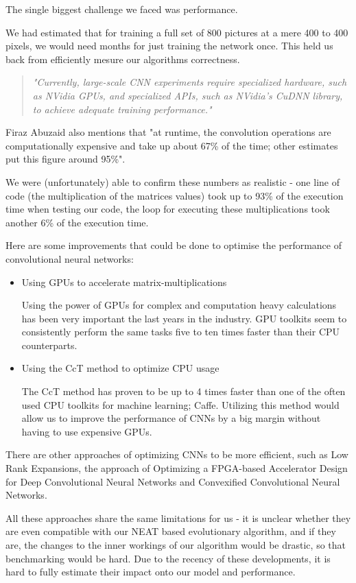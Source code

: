 The single biggest challenge we faced was performance.

We had estimated that for training a full set of 800 pictures at a mere 400 to 400 pixels, we would need months for just training the network once. This held us back from efficiently mesure our algorithms correctness.

\begin{quote}
	\emph{"Currently, large-scale CNN experiments require specialized hardware, such as NVidia GPUs,
		and specialized APIs, such as NVidia’s CuDNN library, to
		achieve  adequate  training  performance."} \cite{Abuzaid2015} 
\end{quote}

Firaz Abuzaid also mentions that "at runtime,  the convolution operations are computationally expensive and take up about 67\% of the time; other estimates put this figure around 95\%".

We were (unfortunately) able to confirm these numbers as realistic - one line of code (the multiplication of the matrices values) took up to 93\% of the execution time when testing our code, the loop for executing these multiplications took another 6\% of the execution time. 

Here are some improvements that could be done to optimise the performance of convolutional neural networks:

\begin{itemize}
	\item Using GPUs to accelerate matrix-multiplications\cite{Hochberg2012}
	
	Using the power of GPUs for complex and computation heavy calculations has been very important the last years in the industry. GPU toolkits seem to consistently perform the same tasks five to ten times faster than their CPU counterparts.\cite{Abuzaid2015}
	
	\item Using the CcT method to optimize CPU usage
	
	The CcT method has proven to be up to 4 times faster than one of the often used CPU toolkits for machine learning; Caffe. Utilizing this method would allow us to improve the performance of CNNs by a big margin without having to use expensive GPUs.\cite{Abuzaid2015}
\end{itemize}

There are other approaches of optimizing CNNs to be more efficient, such as Low Rank Expansions\cite{Jaderberg2014},  the approach of Optimizing a FPGA-based Accelerator Design for Deep Convolutional Neural Networks\cite{Zhang2015} and Convexified Convolutional Neural Networks\cite{Zhang2016}.

All these approaches share the same limitations for us - it is unclear whether they are even compatible with our NEAT based evolutionary algorithm, and if they are, the changes to the inner workings of our algorithm would be drastic, so that benchmarking would be hard. Due to the recency of these developments, it is hard to fully estimate their impact onto our model and performance.